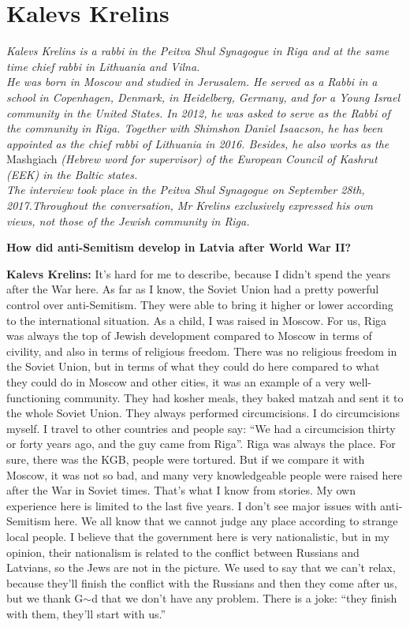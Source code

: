 \section{Kalevs Krelins}

\textit{Kalevs Krelins is a rabbi in the Peitva Shul Synagogue in Riga and at the same time chief rabbi in Lithuania and Vilna.\\
He was born in Moscow and studied in Jerusalem. He served as a Rabbi in a school in Copenhagen, Denmark, in Heidelberg, Germany, and for a Young Israel community in the United States. In 2012, he was asked to serve as the Rabbi of the community in Riga. Together with Shimshon Daniel Isaacson, he has been appointed as the chief rabbi of Lithuania in 2016. Besides, he also works as the} Mashgiach \textit{(Hebrew word for supervisor) of the European Council of Kashrut (EEK) in the Baltic states.\\
The interview took place in the Peitva Shul Synagogue on September 28th, 2017.Throughout the conversation, Mr Krelins exclusively expressed his own views, not those of the Jewish community in Riga.} \par 
\vspace*{2em}
\textbf{How did anti-Semitism develop in Latvia after World War II?}  

\textbf{Kalevs Krelins:} It’s hard for me to describe, because I didn’t spend the years after the War here. As far as I know, the Soviet Union had a pretty powerful control over anti-Semitism. They were able to bring it higher or lower according to the international situation. As a child, I was raised in Moscow. For us, Riga was always the top of Jewish development compared to Moscow in terms of civility, and also in terms of religious freedom. There was no religious freedom in the Soviet Union, but in terms of what they could do here compared to what they could do in Moscow and other cities, it was an example of a very well-functioning community. They had kosher meals, they baked matzah and sent it to the whole Soviet Union. They always performed circumcisions. I do circumcisions myself. I travel to other countries and people say: ``We had a circumcision thirty or forty years ago, and the guy came from Riga''. Riga was always the place. For sure, there was the KGB, people were tortured. But if we compare it with Moscow, it was not so bad, and many very knowledgeable people were raised here after the War in Soviet times. That’s what I know from stories. My own experience here is limited to the last five years. I don’t see major issues with anti-Semitism here.  We all know that we cannot judge any place according to strange local people. I believe that the government here is very nationalistic, but in my opinion, their nationalism is related to the conflict between Russians and Latvians, so the Jews are not in the picture. We used to say that we can’t relax, because they’ll finish the conflict with the Russians and then they come after us, but we thank G$\sim$d that we don’t have any problem. There is a joke: ``they finish with them, they’ll start with us.''  

